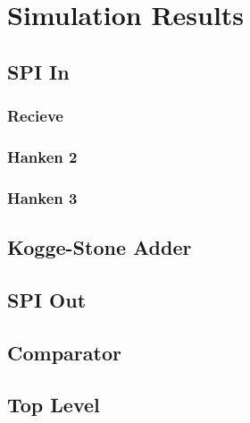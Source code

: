 \section{Simulation Results}

\subsection{SPI In}

\subsubsection{Recieve}

\subsubsection{Hanken 2}

\subsubsection{Hanken 3}

\subsection{Kogge-Stone Adder}

\subsection{SPI Out}

\subsection{Comparator}

\subsection{Top Level}
